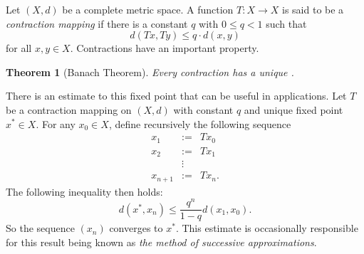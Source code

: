\documentclass[12pt]{article}
\newtheorem{thm}{Theorem}
\theoremstyle{definition}
\theoremstyle{definition}
\theoremstyle{definition}
\begin{document}

Let $(X,d)$ be a complete metric space.  A function $T:X \to X$ is said to be a \emph{contraction mapping} if there is a constant $q$ with $0 \leq q < 1$ such that
\[
  d(Tx,Ty)\leq q\cdot d(x,y)
\]
for all $x,y\in X$.  Contractions have an important property.

\begin{thm}[Banach  Theorem]
Every contraction has a unique .
\end{thm}

There is an estimate to this fixed point that can be useful in applications.  Let $T$ be a contraction mapping on $(X,d)$ with constant $q$ and unique fixed point $x^* \in X$.  For any $x_0 \in X$, define recursively the following sequence
\begin{eqnarray*}
  x_1      &:=& Tx_0   \\
  x_2      &:=& Tx_1   \\
         &\vdots&      \\
  x_{n+1}  &:=& Tx_n.
\end{eqnarray*}
The following inequality then holds:
\[
  d(x^*,x_n)\leq \frac{q^n}{1-q}d(x_1,x_0).
\]
So the sequence $(x_n)$ converges to $x^*$.  This  estimate is occasionally responsible for this result being known as \emph{the method of successive approximations}.
\end{document}
